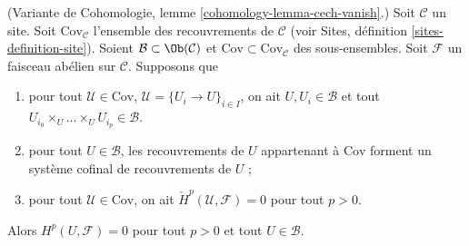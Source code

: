 \begin{lemma}
\label{lemma-cech-vanish-collection}
(Variante de Cohomologie, lemme \ref{cohomology-lemma-cech-vanish}.)
Soit $\mathcal{C}$ un site. Soit $\text{Cov}_\mathcal{C}$ l'ensemble des
recouvrements de $\mathcal{C}$ (voir Sites, définition
\ref{sites-definition-site}). Soient $\mathcal{B} \subset \Ob(\mathcal{C})$
et $\text{Cov} \subset \text{Cov}_\mathcal{C}$ des sous-ensembles. Soit
$\mathcal{F}$ un faisceau abélien sur $\mathcal{C}$. Supposons que
\begin{enumerate}
\item pour tout $\mathcal{U} \in \text{Cov}$,
$\mathcal{U} = \{U_i \to U\}_{i \in I}$, on ait
$U, U_i \in \mathcal{B}$ et tout
$U_{i_0} \times_U \ldots \times_U U_{i_p} \in \mathcal{B}$.
\item pour tout $U \in \mathcal{B}$, les recouvrements de $U$ appartenant à
$\text{Cov}$ forment un système cofinal de recouvrements de $U$ ;
\item pour tout $\mathcal{U} \in \text{Cov}$, on ait
$\check{H}^p(\mathcal{U}, \mathcal{F}) = 0$ pour tout $p > 0$.
\end{enumerate}
Alors $H^p(U, \mathcal{F}) = 0$ pour tout $p > 0$ et tout
$U \in \mathcal{B}$.
\end{lemma}

